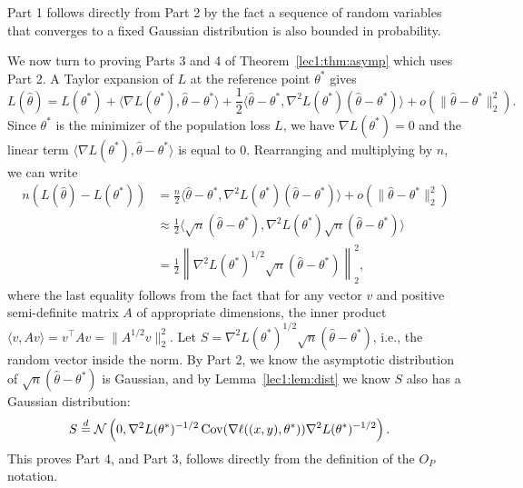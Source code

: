 Part 1 follows directly from Part 2 by the fact a sequence of random variables that converges to a fixed Gaussian distribution is also bounded in probability.

We now turn to proving Parts 3 and 4 of Theorem~\ref{lec1:thm:asymp} which uses Part 2. A Taylor expansion of $L$ at the reference point $\theta^*$ gives
\begin{equation}
L(\hat \theta) = L(\theta^*) 
+ \langle \nabla L(\theta^*), \hat \theta - \theta^* \rangle 
+ \frac12 \langle \hat \theta - \theta^*, \nabla^2 L(\theta^*) (\hat \theta - \theta^*) \rangle + o(\|\hat \theta - \theta^*\|_2^2).
\end{equation}
Since $\theta^*$ is the minimizer of the population loss $L$, we have $\nabla L(\theta^*) = 0$ and the linear term $\langle \nabla L(\theta^*), \hat \theta - \theta^* \rangle$ is equal to 0. Rearranging and multiplying by $n$, we can write
\begin{align}
n (L(\hat \theta) - L(\theta^*)) &= \frac{n}{2} \langle \hat \theta - \theta^*, \nabla^2 L(\theta^*) (\hat \theta - \theta^*) \rangle + o(\|\hat \theta - \theta^*\|_2^2) \\
&\approx \frac12 \langle \sqrt n(\hat \theta - \theta^*), \nabla^2 L(\theta^*) \sqrt n (\hat \theta - \theta^*) \rangle \\
&= \frac12 \left\|\nabla^2 L(\theta^*)^{1/2} \sqrt n(\hat \theta - \theta^*) \right\|_2^2,
\end{align}
where the last equality follows from the fact that for any vector $v$ and positive semi-definite matrix $A$ of appropriate dimensions, the inner product $\langle v, Av\rangle = v^\top Av = \lVert A^{1/2}v \rVert_2^2$. Let $S = \nabla^2 L(\theta^*)^{1/2} \sqrt n(\hat \theta - \theta^*)$, i.e., the random vector inside the norm. By Part 2, we know the asymptotic distribution of $\sqrt n(\hat \theta - \theta^*)$ is Gaussian, and by Lemma~\ref{lec1:lem:dist} we know $S$ also has a Gaussian distribution: 
\begin{align}
    S %
    &\stackrel{d}{=} \cN \left(0, \nabla^2 L(\theta^*)^{-1/2} \Cov(\nabla \ell ((x, y), \theta^*)) \nabla^2 L(\theta^*)^{-1/2} \right).
\end{align}
This proves Part 4, and Part 3,  follows directly from the definition of the $O_P$ notation. 

